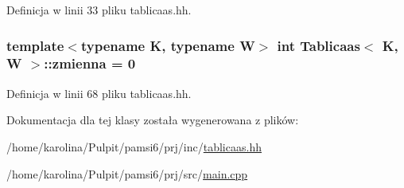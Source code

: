 Definicja w linii 33 pliku tablicaas.\-hh.

\hypertarget{class_tablicaas_a6710dabb371ab39cb600fa7fcf2e06ed}{
\subsubsection[{zmienna}]{\setlength{\rightskip}{0pt plus 5cm}template$<$typename K, typename W$>$ int {\bf Tablicaas}$<$ K, W $>$\-::zmienna = 0\hspace{0.3cm}{\ttfamily [static]}}}\label{class_tablicaas_a6710dabb371ab39cb600fa7fcf2e06ed}


Definicja w linii 68 pliku tablicaas.\-hh.



Dokumentacja dla tej klasy została wygenerowana z plików\-:\begin{DoxyCompactItemize}
\item 
/home/karolina/\-Pulpit/pamsi6/prj/inc/\hyperlink{tablicaas_8hh}{tablicaas.\-hh}\item 
/home/karolina/\-Pulpit/pamsi6/prj/src/\hyperlink{main_8cpp}{main.\-cpp}\end{DoxyCompactItemize}
